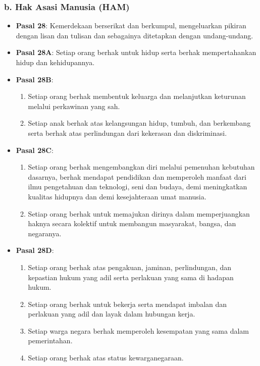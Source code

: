 \subsubsection{b. Hak Asasi Manusia (HAM)}
\begin{itemize}
    \item \textbf{Pasal 28}: Kemerdekaan berserikat dan berkumpul, mengeluarkan pikiran dengan lisan dan tulisan dan sebagainya ditetapkan dengan undang-undang.
    \item \textbf{Pasal 28A}: Setiap orang berhak untuk hidup serta berhak mempertahankan hidup dan kehidupannya.
    \item \textbf{Pasal 28B}:
    \begin{enumerate}
        \item Setiap orang berhak membentuk keluarga dan melanjutkan keturunan melalui perkawinan yang sah.
        \item Setiap anak berhak atas kelangsungan hidup, tumbuh, dan berkembang serta berhak atas perlindungan dari kekerasan dan diskriminasi.
    \end{enumerate}
    \item \textbf{Pasal 28C}:
    \begin{enumerate}
        \item Setiap orang berhak mengembangkan diri melalui pemenuhan kebutuhan dasarnya, berhak mendapat pendidikan dan memperoleh manfaat dari ilmu pengetahuan dan teknologi, seni dan budaya, demi meningkatkan kualitas hidupnya dan demi kesejahteraan umat manusia.
        \item Setiap orang berhak untuk memajukan dirinya dalam memperjuangkan haknya secara kolektif untuk membangun masyarakat, bangsa, dan negaranya.
    \end{enumerate}
    \item \textbf{Pasal 28D}:
    \begin{enumerate}
        \item Setiap orang berhak atas pengakuan, jaminan, perlindungan, dan kepastian hukum yang adil serta perlakuan yang sama di hadapan hukum.
        \item Setiap orang berhak untuk bekerja serta mendapat imbalan dan perlakuan yang adil dan layak dalam hubungan kerja.
        \item Setiap warga negara berhak memperoleh kesempatan yang sama dalam pemerintahan.
        \item Setiap orang berhak atas status kewarganegaraan.
    \end{enumerate}

\end{itemize}
